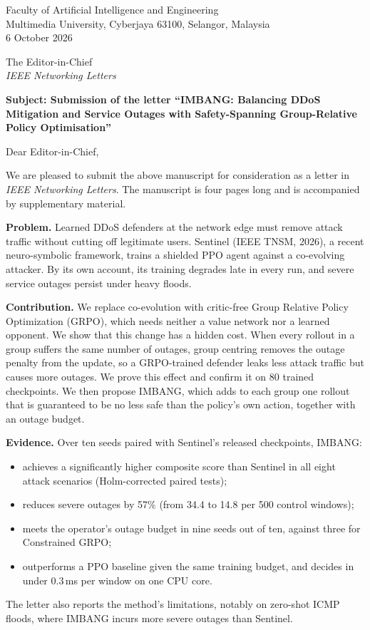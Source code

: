 \documentclass[11pt,a4paper]{article}
\begin{document}
\begin{flushright}
Faculty of Artificial Intelligence and Engineering\\
Multimedia University, Cyberjaya 63100, Selangor, Malaysia\\[4pt]
6 October 2026
\end{flushright}

The Editor-in-Chief\\
\emph{IEEE Networking Letters}

\textbf{Subject: Submission of the letter ``IMBANG: Balancing DDoS Mitigation and Service Outages with Safety-Spanning Group-Relative Policy Optimisation''}

Dear Editor-in-Chief,

We are pleased to submit the above manuscript for consideration as a letter in \emph{IEEE Networking Letters}. The manuscript is four pages long and is accompanied by supplementary material.

\textbf{Problem.} Learned DDoS defenders at the network edge must remove attack traffic without cutting off legitimate users. Sentinel (IEEE TNSM, 2026), a recent neuro-symbolic framework, trains a shielded PPO agent against a co-evolving attacker. By its own account, its training degrades late in every run, and severe service outages persist under heavy floods.

\textbf{Contribution.} We replace co-evolution with critic-free Group Relative Policy Optimization (GRPO), which needs neither a value network nor a learned opponent. We show that this change has a hidden cost. When every rollout in a group suffers the same number of outages, group centring removes the outage penalty from the update, so a GRPO-trained defender leaks less attack traffic but causes more outages. We prove this effect and confirm it on 80 trained checkpoints. We then propose IMBANG, which adds to each group one rollout that is guaranteed to be no less safe than the policy's own action, together with an outage budget.

\textbf{Evidence.} Over ten seeds paired with Sentinel's released checkpoints, IMBANG:
\begin{itemize}[nosep,leftmargin=1.4em]
\item achieves a significantly higher composite score than Sentinel in all eight attack scenarios (Holm-corrected paired tests);
\item reduces severe outages by 57\% (from 34.4 to 14.8 per 500 control windows);
\item meets the operator's outage budget in nine seeds out of ten, against three for Constrained GRPO;
\item outperforms a PPO baseline given the same training budget, and decides in under 0.3\,ms per window on one CPU core.
\end{itemize}
The letter also reports the method's limitations, notably on zero-shot ICMP floods, where IMBANG incurs more severe outages than Sentinel.
\end{document}
